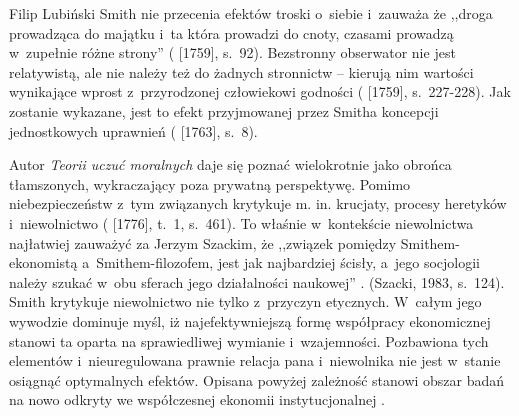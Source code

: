 \begin{artplenv}{Filip Lubiński}
Smith nie przecenia efektów troski o~siebie i~zauważa że ,,droga prowadząca do majątku i~ta która prowadzi do
cnoty, czasami prowadzą w~zupełnie różne strony''
(\cite{smith_teoria_1989} [1759], s.~92).
Bezstronny
obserwator nie jest relatywistą, ale nie należy też do żadnych stronnictw -- kierują nim wartości wynikające
wprost z~przyrodzonej człowiekowi godności
(\cite{smith_teoria_1989} [1759], s.~227-228).
Jak zostanie wykazane,
jest to efekt przyjmowanej przez Smitha koncepcji jednostkowych uprawnień
(\cite{smith_lectures_1982} [1763], s.~8).

Autor \textit{Teorii uczuć moralnych} daje się poznać wielokrotnie jako obrońca tłamszonych, wykraczający poza
prywatną perspektywę. Pomimo niebezpieczeństw z~tym związanych krytykuje m. in. krucjaty, procesy
heretyków i~niewolnictwo
(\cite{smith_badania_2007} [1776], t.~1, s.~461).
To właśnie w~kontekście niewolnictwa
najłatwiej zauważyć za Jerzym Szackim, że ,,związek pomiędzy Smithem-ekonomistą a~Smithem-filozofem, jest jak
najbardziej ścisły, a~jego socjologii należy szukać w~obu sferach jego działalności naukowej''
\parencite[s.~124]{szacki_historia_1983}.
\label{ref:RNDC8VLy7vrzx}(Szacki, 1983, s.~124).
Smith krytykuje niewolnictwo nie tylko z~przyczyn etycznych. W~całym
jego wywodzie dominuje myśl, iż najefektywniejszą formę współpracy ekonomicznej stanowi ta oparta na sprawiedliwej
wymianie i~wzajemności. Pozbawiona tych elementów i~nieuregulowana prawnie relacja pana i~niewolnika nie jest w~stanie
osiągnąć optymalnych efektów. Opisana powyżej zależność stanowi obszar badań na nowo odkryty we współczesnej ekonomii
instytucjonalnej
\parencite{acemoglu_dlaczego_2014}.


\end{artplenv}
